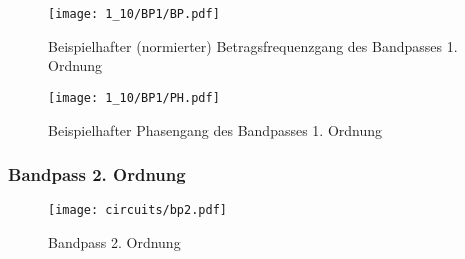 

\begin{figure}[H]
  \begin{center}
    \texttt{[image: 1\_10/BP1/BP.pdf]}
  \end{center}
  \caption{Beispielhafter (normierter) Betragsfrequenzgang des Bandpasses 1. Ordnung}
\end{figure}

\begin{figure}[H]
  \begin{center}
    \texttt{[image: 1\_10/BP1/PH.pdf]}
  \end{center}
  \caption{Beispielhafter Phasengang des Bandpasses 1. Ordnung}
\end{figure}


\subsubsection{Bandpass 2. Ordnung}

\begin{figure}[H]
  \begin{center}
    \texttt{[image: circuits/bp2.pdf]}
  \end{center}
  \caption{Bandpass 2. Ordnung}
\end{figure}

\begin{center}
\end{center}